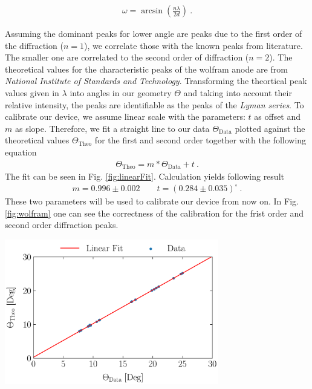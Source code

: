 \begin{gather}
    \omega = \arcsin\left(\frac{n \lambda}{2 d}\right)~.
    \label{eq:angle}
\end{gather}

Assuming the dominant peaks for lower angle are peaks due to the first order of the diffraction ($n = 1$), we correlate those with the known peaks from literature. The smaller one are correlated to the second order of diffraction ($n = 2$). The theoretical values for the characteristic peaks of the wolfram anode are from \textit{National Institute of Standards and Technology}. Transforming the theortical peak values given in $\lambda$ into angles in our geometry $\Theta$ and taking into account their relative intensity, the peaks are identifiable as the peaks of the \textit{Lyman series}.
\bigskip
To calibrate our device, we assume linear scale with the parameters: $t$ as offset and $m$ as slope. Therefore, we 
fit a straight line to our data $\Theta_\mathrm{Data}$ plotted against the theoretical values $\Theta_\mathrm{Theo}$ for the first and second order together with the following equation
\begin{gather}
    \Theta_\mathrm{Theo} = m * \Theta_\mathrm{Data} + t~.
    \label{eq:fitLin}
\end{gather}
The fit can be seen in Fig. \ref{fig:linearFit}. Calculation yields following result
\begin{gather*}
    \boxed{m = 0.996 \pm 0.002 \qquad t = (0.284 \pm 0.035)^\circ}~.
\end{gather*}
These two parameters will be used to calibrate our device from now on. In Fig. \ref{fig:wolfram} one can see the correctness of the calibration for the frist order and second order diffraction peaks.

\begin{center}
    \captionsetup{type = figure}
    \includegraphics[width = 0.7\textwidth]{Pictures/Evaluation/41/Linear-Fit.pdf}
    \label{fig:linearFit}
\end{center}

